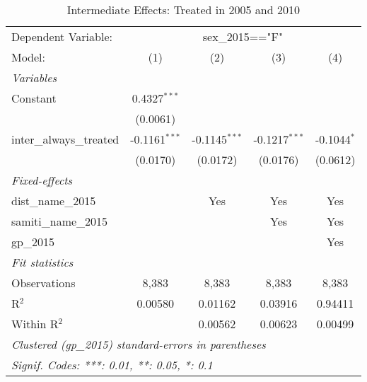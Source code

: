 
\begin{table}[htbp]
   \caption{Intermediate Effects: Treated in 2005 and 2010}
   \centering
   \begin{tabular}{lcccc}
      \tabularnewline \midrule \midrule
      Dependent Variable: & \multicolumn{4}{c}{sex\_2015=="F"}\\
      Model:                   & (1)             & (2)             & (3)             & (4)\\  
      \midrule
      \emph{Variables}\\
      Constant                 & 0.4327$^{***}$  &                 &                 &   \\   
                               & (0.0061)        &                 &                 &   \\   
      inter\_always\_treated   & -0.1161$^{***}$ & -0.1145$^{***}$ & -0.1217$^{***}$ & -0.1044$^{*}$\\   
                               & (0.0170)        & (0.0172)        & (0.0176)        & (0.0612)\\   
      \midrule
      \emph{Fixed-effects}\\
      dist\_name\_2015         &                 & Yes             & Yes             & Yes\\  
      samiti\_name\_2015       &                 &                 & Yes             & Yes\\  
      gp\_2015                 &                 &                 &                 & Yes\\  
      \midrule
      \emph{Fit statistics}\\
      Observations             & 8,383           & 8,383           & 8,383           & 8,383\\  
      R$^2$                    & 0.00580         & 0.01162         & 0.03916         & 0.94411\\  
      Within R$^2$             &                 & 0.00562         & 0.00623         & 0.00499\\  
      \midrule \midrule
      \multicolumn{5}{l}{\emph{Clustered (gp\_2015) standard-errors in parentheses}}\\
      \multicolumn{5}{l}{\emph{Signif. Codes: ***: 0.01, **: 0.05, *: 0.1}}\\
   \end{tabular}
\end{table}


